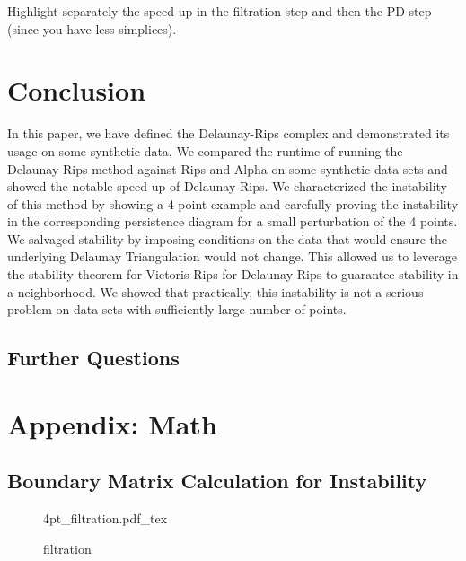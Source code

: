 \documentclass[letterpaper,titlepage]{article}
\newcommand{\incfig}[1]{%
    {#1.pdf_tex}
}
\begin{document}
    
    Highlight separately the speed up in the filtration step and then the PD step (since you have less simplices).

\section{Conclusion}
In this paper, we have defined the Delaunay-Rips complex and demonstrated its usage on some synthetic data. We compared the runtime of running the Delaunay-Rips method against Rips and Alpha on some synthetic data sets and showed the notable speed-up of Delaunay-Rips. We characterized the instability of this method by showing a 4 point example and carefully proving the instability in the corresponding persistence diagram for a small perturbation of the 4 points. We salvaged stability by imposing conditions on the data that would ensure the underlying Delaunay Triangulation would not change. This allowed us to leverage the stability theorem for Vietoris-Rips for Delaunay-Rips to guarantee stability in a neighborhood. We showed that practically, this instability is not a serious problem on data sets with sufficiently large number of points.


\subsection{Further Questions}


\appendix
\section{Appendix: Math}

\subsection{Boundary Matrix Calculation for Instability}\label{boundary_mat}

\begin{figure}[ht]
    \centering
    \def\svgwidth{\columnwidth}
    \incfig{4pt_filtration}
    \caption{filtration}
    \label{fig:4pt_filtration}
\end{figure}
\end{document}
